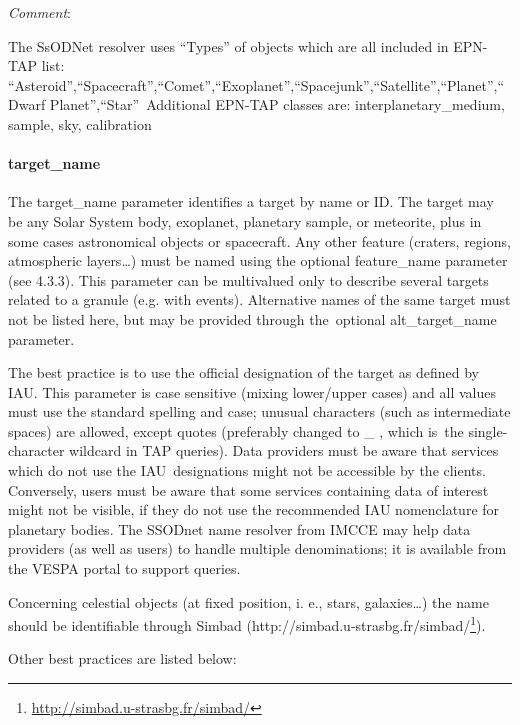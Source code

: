 \documentclass[11pt,a4paper]{ivoa}
\begin{document}
\emph{Comment}: 

The SsODNet resolver uses ``Types'' of objects which are all included in EPN-TAP list: ``Asteroid'',``Spacecraft'',``Comet'',``Exoplanet'',``Spacejunk'',``Satellite'',``Planet'',``Dwarf Planet'',``Star'' Additional EPN-TAP classes are: interplanetary\_medium, sample, sky, calibration \\

\paragraph{target\_name}

The target\_name parameter identifies a target by name or ID. The target may be any Solar System body, exoplanet, planetary sample, or meteorite, plus in some cases astronomical objects or spacecraft. Any other feature (craters, regions, atmospheric layers…) must be named using the optional feature\_name parameter (see 4.3.3). This parameter can be multivalued only to describe several targets related to a granule (e.g. with events). Alternative names of the same target must not be listed here, but may be provided through the optional alt\_target\_name parameter. 

The best practice is to use the official designation of the target as defined by IAU. This parameter is case sensitive (mixing lower/upper cases) and all values must use the standard spelling and case; unusual characters (such as intermediate spaces) are allowed, except quotes (preferably changed to \_ , which is the single-character wildcard in TAP queries). Data providers must be aware that services which do not use the IAU designations might not be accessible by the clients. Conversely, users must be aware that some services containing data of interest might not be visible, if they do not use the recommended IAU nomenclature for planetary bodies. The SSODnet name resolver from IMCCE may help data providers (as well as users) to handle multiple denominations; it is available from the VESPA portal to support queries.

Concerning celestial objects (at fixed position, i. e., stars, galaxies…) the name should be identifiable through Simbad (http://simbad.u-strasbg.fr/simbad/\footnote{\url{http://simbad.u-strasbg.fr/simbad/}}).

Other best practices are listed below:
\end{document}
